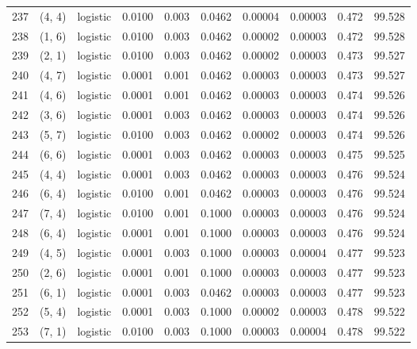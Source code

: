 \begin{tabular}{lllrrrrrrr}
237 &      (4, 4) &  logistic &  0.0100 &  0.003 &  0.0462 &          0.00004 &    0.00003 &       0.472 &    99.528 \\
238 &      (1, 6) &  logistic &  0.0100 &  0.003 &  0.0462 &          0.00002 &    0.00003 &       0.472 &    99.528 \\
239 &      (2, 1) &  logistic &  0.0100 &  0.003 &  0.0462 &          0.00002 &    0.00003 &       0.473 &    99.527 \\
240 &      (4, 7) &  logistic &  0.0001 &  0.001 &  0.0462 &          0.00003 &    0.00003 &       0.473 &    99.527 \\
241 &      (4, 6) &  logistic &  0.0001 &  0.001 &  0.0462 &          0.00003 &    0.00003 &       0.474 &    99.526 \\
242 &      (3, 6) &  logistic &  0.0001 &  0.003 &  0.0462 &          0.00003 &    0.00003 &       0.474 &    99.526 \\
243 &      (5, 7) &  logistic &  0.0100 &  0.003 &  0.0462 &          0.00002 &    0.00003 &       0.474 &    99.526 \\
244 &      (6, 6) &  logistic &  0.0001 &  0.003 &  0.0462 &          0.00003 &    0.00003 &       0.475 &    99.525 \\
245 &      (4, 4) &  logistic &  0.0001 &  0.003 &  0.0462 &          0.00003 &    0.00003 &       0.476 &    99.524 \\
246 &      (6, 4) &  logistic &  0.0100 &  0.001 &  0.0462 &          0.00003 &    0.00003 &       0.476 &    99.524 \\
247 &      (7, 4) &  logistic &  0.0100 &  0.001 &  0.1000 &          0.00003 &    0.00003 &       0.476 &    99.524 \\
248 &      (6, 4) &  logistic &  0.0001 &  0.001 &  0.1000 &          0.00003 &    0.00003 &       0.476 &    99.524 \\
249 &      (4, 5) &  logistic &  0.0001 &  0.003 &  0.1000 &          0.00003 &    0.00004 &       0.477 &    99.523 \\
250 &      (2, 6) &  logistic &  0.0001 &  0.001 &  0.1000 &          0.00003 &    0.00003 &       0.477 &    99.523 \\
251 &      (6, 1) &  logistic &  0.0001 &  0.003 &  0.0462 &          0.00003 &    0.00003 &       0.477 &    99.523 \\
252 &      (5, 4) &  logistic &  0.0001 &  0.003 &  0.1000 &          0.00002 &    0.00003 &       0.478 &    99.522 \\
253 &      (7, 1) &  logistic &  0.0100 &  0.003 &  0.1000 &          0.00003 &    0.00004 &       0.478 &    99.522 \\

\end{tabular}
